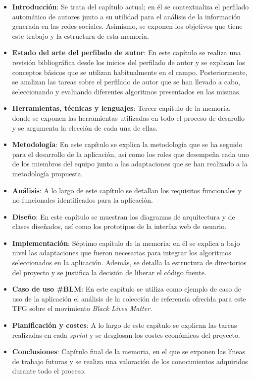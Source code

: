 \begin{itemize}
	\item \textbf{Introducción}: Se trata del capítulo actual; en él se contextualiza el perfilado automático de autores junto a su utilidad
		para el análisis de la información generada en las redes sociales. Asimismo, se exponen los objetivos que tiene este trabajo y la estructura
		de esta memoria.
	
	\item \textbf{Estado del arte del perfilado de autor}: En este capítulo se realiza una revisión bibliográfica desde los inicios del perfilado de autor y se explican
		los conceptos básicos que se utilizan habitualmente en el campo. Posteriormente, se analizan las tareas sobre el perfilado de autor que se han llevado a cabo,
		seleccionando y evaluando diferentes algoritmos presentados en las mismas.

	\item \textbf{Herramientas, técnicas y lenguajes}: Tercer capítulo de la memoria, donde se exponen las herramientas utilizadas en todo el proceso de desarollo
		y se argumenta la elección de cada una de ellas.

	\item \textbf{Metodología}: En este capítulo se explica la metodología que se ha seguido para el desarrollo de la aplicación, así como
		los roles que desempeña cada uno de los miembros del equipo junto a las adaptaciones que se han realizado a la metodología propuesta.

	\item \textbf{Análisis}: A lo largo de este capítulo se detallan los requisitos funcionales y no funcionales identificados para la aplicación.
	
	\item \textbf{Diseño}: En este capítulo se muestran los diagramas de arquitectura y de clases diseñados, así como los prototipos de la interfaz web de usuario.

	\item \textbf{Implementación}: Séptimo capítulo de la memoria; en él se explica a bajo nivel las adaptaciones que fueron necesarias para integrar los algoritmos
		seleccionados en la aplicación. Además, se detalla la estructura de directorios del proyecto y se justifica la decisión de liberar el código fuente.

	\item \textbf{Caso de uso \#BLM}: En este capítulo se utiliza como ejemplo de caso de uso de la aplicación el análisis de la colección de referencia ofrecida para este TFG
		sobre el movimiento \textit{Black Lives Matter}.

	\item \textbf{Planificación y costes}: A lo largo de este capítulo se explican las tareas realizadas en cada \textit{sprint} y se desglosan los costes
		económicos del proyecto.

	\item \textbf{Conclusiones}: Capítulo final de la memoria, en el que se exponen las líneas de trabajo futuras y se realiza una valoración de los conocimientos
		adquiridos durante todo el proceso.

\end{itemize}

